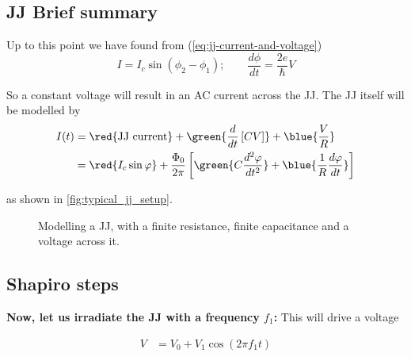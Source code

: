    \subsection{JJ Brief summary}
   \label{sec:jj-brief-summary}

\begin{framed}\noindent
  Up to this point we have found from (\autoref{eq:jj-current-and-voltage})
  \begin{equation}
    I = I_c\sin(\phi_2-\phi_1); \qquad \frac{d\phi}{dt} = \frac{2e}{\hbar}V
  \end{equation}

  \noindent So a constant voltage will result in an AC current across the JJ. The JJ itself will be modelled by
  \begin{equation}\label{eq:jj-total-current}
    \begin{aligned}
      I(t) & = \red{\text{JJ current}} + \green{\frac{d}{dt}\left[ CV \right]} + \blue{\frac{V}{R}}\\
      &    =    \red{I_c\sin\varphi}    +     \frac{\Phi_{0}}{2\pi}\left[    \green{C    \frac{d^2\varphi}{dt^{2}}}    +
        \blue{\frac{1}{R}\frac{d\varphi}{dt}} \right]
    \end{aligned}
  \end{equation}

  \noindent as shown in \autoref{fig:typical_jj_setup}.
\end{framed}

\begin{figure}[h]
  \centering {}
  \caption{\small   Modelling  a   JJ,  with   a   finite  resistance,   finite   capacitance  and   a  voltage   across
    it.\label{fig:typical_jj_setup}}
\end{figure}

\subsection{Shapiro steps}
\label{sec:shapiro-steps}

\textbf{Now, let us irradiate the JJ with a frequency $f_1$:} This will drive a voltage

\begin{equation}
  \begin{aligned}
    V & = V_0 + V_1\cos\left(2\pi f_1 t  \right)\\
  \end{aligned}
\end{equation}


